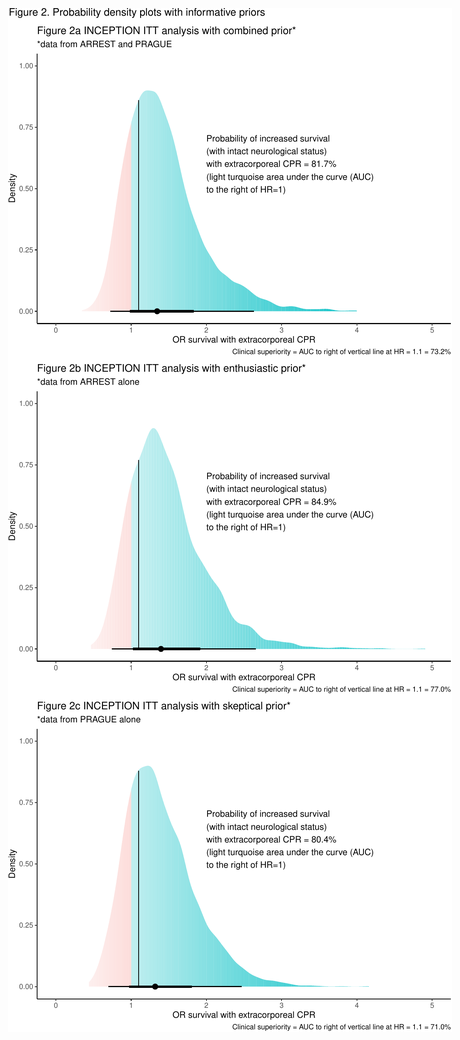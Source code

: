 \documentclass[
  super,
  preprint,
  3p]{elsarticle}
\begin{document}
\includegraphics{manuscript_files/figure-pdf/fig2-1.pdf}

\newpage


\renewcommand\refname{References}
  
\end{document}
